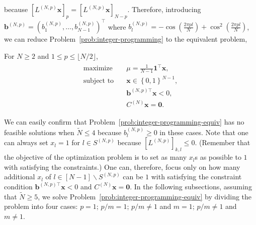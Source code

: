 because $\left[L^{(N,p)}\bm{x}\right]_{p}=\left[L^{(N,p)}\bm{x}\right]_{N-p}$. Therefore, introducing $\bm{b}^{(N,p)} = \left(b^{(N,p)}_{1},\dots,b^{(N,p)}_{N-1}\right)^{\top}$ where $b^{(N,p)}_{l}=-\cos\left(\frac{2\pi pl}{N}\right)+\cos^2\left(\frac{2\pi pl}{N}\right)$, we can reduce Problem~\ref{prob:integer-programming} to the equivalent problem,
\begin{problem}
    \label{prob:integer-programming-equiv}
    For $N\geq2$ and $1\leq p\leq\lfloor N/2\rfloor$,
    \begin{align}
    \begin{split}
    \textrm{maximize} & \quad\mu=\frac{1}{N-1}\bm{1}^{\top}\bm{x}, \\
    \textrm{subject to} & \quad \bm{x}\in\left\{0,1\right\}^{N-1},\\
    & \quad \bm{b}^{(N,p) \top}\bm{x}<0,\\
    & \quad C^{(N)}\bm{x} = \bm{0}.
    \end{split}
    \label{eq:equiv-problem}
    \end{align}
\end{problem}
We can easily confirm that Problem~\ref{prob:integer-programming-equiv} has no feasible solutions when $\widetilde{N}\leq4$ because $b^{(N,p)}_{l}\geq 0$ in these cases. Note that one can always set $x_l=1$ for $l\in S^{(N,p)}$ because $\left[L^{(N,p)}\right]_{k,l}\leq 0$. (Remember that the objective of the optimization problem is to set as many $x_l$s as possible to $1$ with satisfying the constraints.) One can, therefore, focus only on how many additional $x_l$ of $l\in [N-1]\backslash S^{(N,p)}$ can be $1$ with satisfying the constraint condition $\bm{b}^{(N,p) \top}\bm{x}<0$ and $C^{(N)}\bm{x}=\bm{0}$. In the following subsections, assuming that $\widetilde{N}\geq5$, we solve Problem~\ref{prob:integer-programming-equiv} by dividing the problem into four cases: $p=1$; $p/m=1$; $p/m\ne1$ and $m=1$; $p/m\ne1$ and $m\ne 1$.

